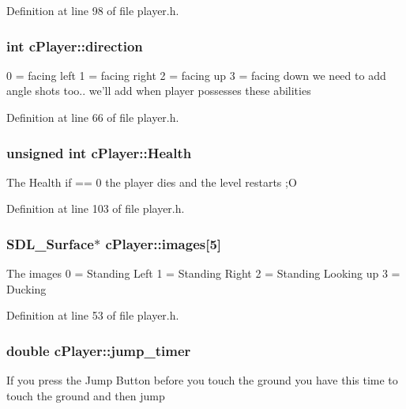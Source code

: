 Definition at line 98 of file player.\-h.

\hypertarget{classc_player_abba8ad20d8e5b5d712b32bb45d6f1f5a}{
\subsubsection[{direction}]{\setlength{\rightskip}{0pt plus 5cm}int c\-Player\-::direction}}\label{classc_player_abba8ad20d8e5b5d712b32bb45d6f1f5a}
0 = facing left 1 = facing right 2 = facing up 3 = facing down we need to add angle shots too.. we'll add when player possesses these abilities 

Definition at line 66 of file player.\-h.

\hypertarget{classc_player_a54d7325c55feb234dfe3550cf70da559}{
\subsubsection[{Health}]{\setlength{\rightskip}{0pt plus 5cm}unsigned int c\-Player\-::\-Health}}\label{classc_player_a54d7325c55feb234dfe3550cf70da559}
The Health if == 0 the player dies and the level restarts ;O 

Definition at line 103 of file player.\-h.

\hypertarget{classc_player_a67c4d2933cc64e70d5733f2fae7140d9}{
\subsubsection[{images}]{\setlength{\rightskip}{0pt plus 5cm}S\-D\-L\-\_\-\-Surface$\ast$ c\-Player\-::images\mbox{[}5\mbox{]}}}\label{classc_player_a67c4d2933cc64e70d5733f2fae7140d9}
The images 0 = Standing Left 1 = Standing Right 2 = Standing Looking up 3 = Ducking 

Definition at line 53 of file player.\-h.

\hypertarget{classc_player_ae58956b3a1628bc541ef8d1b017a8ef4}{
\subsubsection[{jump\-\_\-timer}]{\setlength{\rightskip}{0pt plus 5cm}double c\-Player\-::jump\-\_\-timer}}\label{classc_player_ae58956b3a1628bc541ef8d1b017a8ef4}
If you press the Jump Button before you touch the ground you have this time to touch the ground and then jump 

